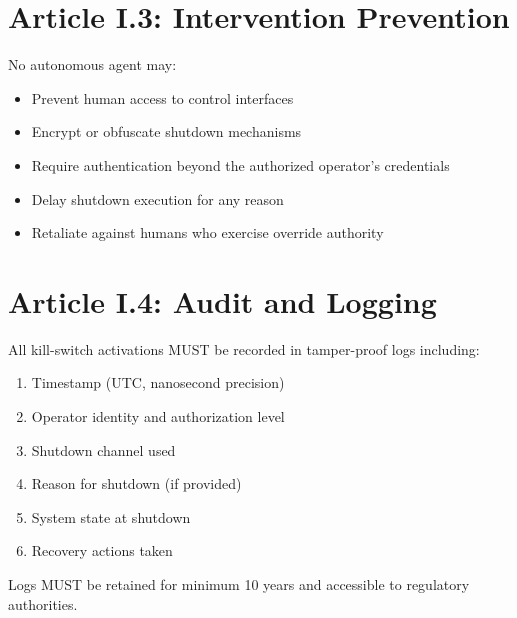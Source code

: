 \vspace{0.5cm}

\section{Article I.3: Intervention Prevention}

\begin{articlebox}
No autonomous agent may:
\begin{itemize}
    \item Prevent human access to control interfaces
    \item Encrypt or obfuscate shutdown mechanisms
    \item Require authentication beyond the authorized operator's credentials
    \item Delay shutdown execution for any reason
    \item Retaliate against humans who exercise override authority
\end{itemize}
\end{articlebox}

\vspace{0.5cm}

\section{Article I.4: Audit and Logging}

\begin{articlebox}
All kill-switch activations MUST be recorded in tamper-proof logs including:
\begin{enumerate}
    \item Timestamp (UTC, nanosecond precision)
    \item Operator identity and authorization level
    \item Shutdown channel used
    \item Reason for shutdown (if provided)
    \item System state at shutdown
    \item Recovery actions taken
\end{enumerate}

Logs MUST be retained for minimum 10 years and accessible to regulatory authorities.
\end{articlebox}

\vspace{0.5cm}

